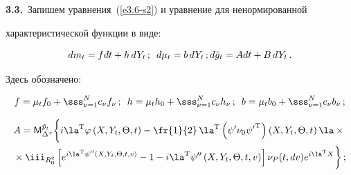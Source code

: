 \textbf{3.3.}\ Запишем уравнения~(\ref{e3.6-s2}) и уравнение для ненормированной

характеристической функции в виде:

\begin{equation*}

dm_t = f dt + h\, dY_t\,;\enskip d\mu_t = b\, dY_t\,; %

d\tilde g_t = A dt + B\,dY_t\,.


\end{equation*}

Здесь обозначено:

$$

f=\mu_t f_0

    +\sss_{\nu=1}^N c_\nu f_\nu\,;\enskip h= \mu_t h_0 +\sss_{\nu=1}^N

    c_\nu h_\nu\,; \enskip b= \mu_t b_0 +\sss_{\nu=1}^N c_\nu b_\nu\,;

    $$



\vspace*{-12pt}



\noindent

    \begin{multline*}

    A={\sf M}_{\Delta^x}^{\tilde{p}_t}  \biggl\{ 

    i\la^{\mathrm{T}} \varphi \left(X,Y_t,\Theta,t\right) -

    \fr{1}{2}\,\la^{\mathrm{T}} \left(\psi' \nu_0 {\psi'}^{\mathrm{T}}\right) 

    \left(X,Y_t,\Theta,t\right) \la\times{}\\

    {}\times \iii_{R_0^q} \left[ e^{i\la^{\mathrm{T}} \psi'' 

    \left(X,Y_t,\Theta,t,v\right)} -1- i\la^{\mathrm{T}}

    \psi'' \left(X,Y_t,\Theta,t,v\right)\right] \nu_P (t,dv) e^{i\la^{\mathrm{T}} X}\biggr\} \,;

    \end{multline*}

    

    \vspace*{-12pt}

    

    \noindent

